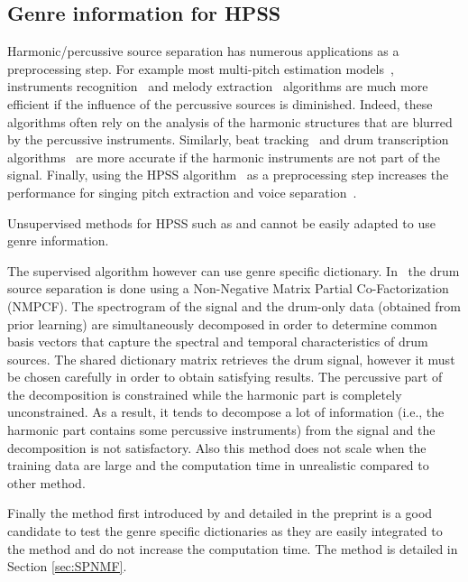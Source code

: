 \documentclass{article}
\begin{document}
\subsection{Genre information for HPSS}

Harmonic/percussive source separation has numerous applications as a preprocessing step. For example most multi-pitch estimation models~\cite{klapuri2008multipitch}, instruments recognition~\cite{eronen2000musical} and melody extraction~\cite{salamon2012melody} algorithms are much more efficient if the influence of the percussive sources is diminished. Indeed, these algorithms often rely on the analysis of the harmonic structures that are blurred by the percussive instruments. Similarly, beat tracking~\cite{ellis2007beat} and drum transcription algorithms~\cite{paulus2005drum} are more accurate if the harmonic instruments are not part of the signal. Finally, using the HPSS algorithm~\cite{fitzgerald2010harmonic} as a preprocessing step increases the performance for singing pitch extraction and voice separation~\cite{hsu2012tandem}. 

Unsupervised methods for HPSS such as \cite{ono2008separation} and \cite{canadas2014percussive} cannot be easily adapted to use genre information.  

The supervised algorithm however can use genre specific dictionary. In~\cite{kim2011nonnegative} the drum source separation is done using a Non-Negative Matrix Partial Co-Factorization (NMPCF). The spectrogram of the signal and the drum-only data (obtained from prior learning) are simultaneously decomposed in order to determine common basis vectors that capture the spectral and temporal characteristics of drum sources. The shared dictionary matrix retrieves the drum signal, however it must be chosen carefully in order to obtain satisfying results. The percussive part of the decomposition is constrained while the harmonic part is completely unconstrained. As a result, it tends to decompose a lot of information (i.e., the harmonic part contains some percussive instruments) from the signal and the decomposition is not satisfactory. Also this method does not scale when the training data are large and the computation time in unrealistic compared to other method.

Finally the method first introduced by \cite{laroche2015structured} and detailed in the preprint is a good candidate to test the genre specific dictionaries as they are easily integrated to the method and do not increase the computation time. The method is detailed in Section \ref{sec:SPNMF}.
\end{document}

